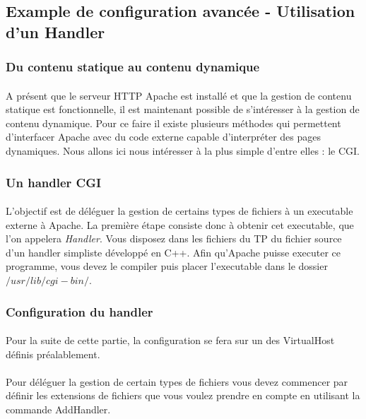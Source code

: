 \documentclass[12pt,a4paper]{article}
\begin{document}
\subsection{Example de configuration avancée - Utilisation d'un Handler}

\subsubsection{Du contenu statique au contenu dynamique}

\paragraph{}
A présent que le serveur HTTP Apache est installé et que la gestion de contenu statique est fonctionnelle, il est maintenant possible de s'intéresser à la gestion de contenu dynamique. Pour ce faire il existe plusieurs méthodes qui permettent d'interfacer Apache avec du code externe capable d'interpréter des pages dynamiques. Nous allons ici nous intéresser à la plus simple d'entre elles : le CGI.

\subsubsection{Un handler CGI}

\paragraph{}
L'objectif est de déléguer la gestion de certains types de fichiers à un executable externe à Apache. La première étape consiste donc à obtenir cet executable, que l'on appelera \textit{Handler}. Vous disposez dans les fichiers du TP du fichier source d'un handler simpliste développé en C++. Afin qu'Apache puisse executer ce programme, vous devez le compiler puis placer l'executable dans le dossier $/usr/lib/cgi-bin/$.

\subsubsection{Configuration du handler}
\paragraph{}
Pour la suite de cette partie, la configuration se fera sur un des VirtualHost définis préalablement.

\paragraph{}
Pour déléguer la gestion de certain types de fichiers vous devez commencer par définir les extensions de fichiers que vous voulez prendre en compte en utilisant la commande AddHandler.
\end{document}
